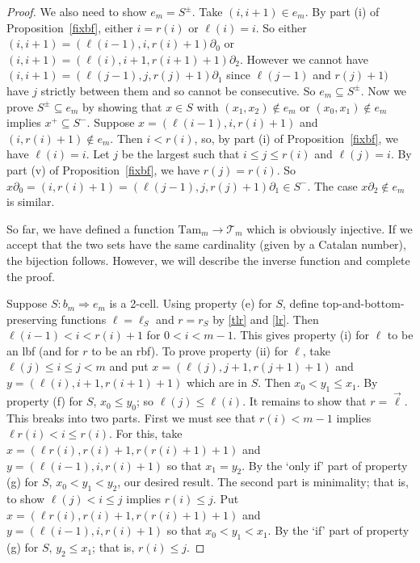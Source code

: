 \documentclass[a4paper,12pt,reqno]{amsart}
\theoremstyle{definition}
\theoremstyle{fact}
\theoremstyle{genquest}
\theoremstyle{step}
\newcommand{\lra}{\longrightarrow}
\newcommand{\Lra}{\Longrightarrow}
\newcommand{\ora}{\overrightarrow}
\def\CT{{\mathscr T}}
\begin{document}
\begin{proof}
We also need to show $e_m = S^{\pm}$. Take $(i,i+1)\in e_m$. 
By part (i) of Proposition~\ref{fixbf}, either $i = r(i)$ or $\ell(i) =i$. 
So either $(i,i+1) = (\ell(i-1), i,r(i)+1)\partial_0$
or $(i,i+1) = (\ell(i), i+1,r(i+1)+1)\partial_2$. 
However we cannot have $(i,i+1) = (\ell(j-1), j,r(j)+1)\partial_1$
since $\ell(j-1)$ and $r(j)+1)$ have $j$ strictly between them 
and so cannot be consecutive.
So $e_m\subseteq S^{\pm}$. 
Now we prove $S^{\pm}\subseteq e_m$ by showing that $x\in S$
with $(x_1,x_2)\notin e_m$ or $(x_0,x_1)\notin e_m$ implies $x^+ \subseteq S^-$.
Suppose $x=(\ell(i-1), i , r(i)+1)$ and $(i , r(i)+1)\notin e_m$.
Then $i<r(i)$, so, by part (i) of Proposition~\ref{fixbf}, we have $\ell(i)=i$. 
Let $j$ be the largest such that $i\le j\le r(i)$ and $\ell(j)=i$.
By part (v) of Proposition~\ref{fixbf}, we have $r(j) = r(i)$.
So $x\partial_0 = (i , r(i)+1) = (\ell(j-1),j,r(j)+1)\partial_1 \in S^-$. 
The case $x\partial_2\notin e_m$ is similar. 

So far, we have defined a function $\mathrm{Tam}_m \lra \CT_m$ which
is obviously injective. If we accept that the two sets have the same cardinality
(given by a Catalan number), the bijection follows. However, we will
describe the inverse function and complete the proof. 

Suppose $S:b_m \Lra e_m$ is a 2-cell. Using property (e) for $S$, 
define top-and-bottom-preserving functions 
$\ell = \ell_S$ and $r=r_S$ by \eqref{tlr} and \eqref{lr}. 
Then $\ell(i-1)< i < r(i)+1$ for $0<i<m-1$.
This gives property (i) for $\ell$ to be an lbf  (and for $r$ to be an rbf).
To prove property (ii) for $\ell$, take $\ell(j)\le i\le j<m$ and put
$x=(\ell(j),j+1,r(j+1)+1)$ and $y=(\ell(i),i+1,r(i+1)+1)$ which are in $S$.
Then $x_0<y_1\le x_1$. By property (f) for $S$, $x_0\le y_0$; so $\ell(j)\le \ell(i)$. 
It remains to show that $r = \ora{\ell}$. 
This breaks into two parts. First we must see that $r(i)<m-1$ implies 
$\ell r(i)<i\le r(i)$. For this, take $x=(\ell r(i),r(i)+1,r(r(i)+1)+1)$ and
$y=(\ell (i-1),i,r(i)+1)$ so that $x_1=y_2$. By the `only if' part of property (g) for $S$,
$x_0<y_1<y_2$, our desired result. The second part is minimality; that is, to show
$\ell(j)<i\le j$ implies $r(i)\le j$. Put $x=(\ell r(i),r(i)+1,r(r(i)+1)+1)$ and
$y=(\ell(i-1),i,r(i)+1)$ so that $x_0<y_1<x_1$. 
By the `if' part of property (g) for $S$, $y_2\le x_1$; that is, $r(i)\le j$.
\end{proof}
\end{document}
